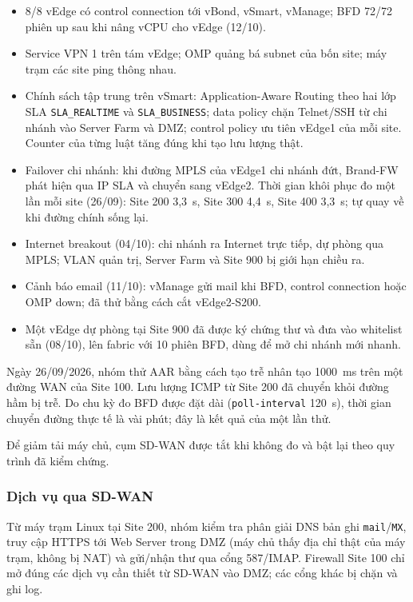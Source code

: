 \begin{itemize}
    \item 8/8 vEdge có control connection tới vBond, vSmart, vManage; BFD 72/72 phiên up sau khi nâng vCPU cho vEdge (12/10).
    \item Service VPN 1 trên tám vEdge; OMP quảng bá subnet của bốn site; máy trạm các site ping thông nhau.
    \item Chính sách tập trung trên vSmart: Application-Aware Routing theo hai lớp SLA \texttt{SLA\_REALTIME} và \texttt{SLA\_BUSINESS}; data policy chặn Telnet/SSH từ chi nhánh vào Server Farm và DMZ; control policy ưu tiên vEdge1 của mỗi site. Counter của từng luật tăng đúng khi tạo lưu lượng thật.
    \item Failover chi nhánh: khi đường MPLS của vEdge1 chi nhánh đứt, Brand-FW phát hiện qua IP SLA và chuyển sang vEdge2. Thời gian khôi phục đo một lần mỗi site (26/09): Site 200 3,3~s, Site 300 4,4~s, Site 400 3,3~s; tự quay về khi đường chính sống lại.
    \item Internet breakout (04/10): chi nhánh ra Internet trực tiếp, dự phòng qua MPLS; VLAN quản trị, Server Farm và Site 900 bị giới hạn chiều ra.
    \item Cảnh báo email (11/10): vManage gửi mail khi BFD, control connection hoặc OMP down; đã thử bằng cách cắt vEdge2-S200.
    \item Một vEdge dự phòng tại Site 900 đã được ký chứng thư và đưa vào whitelist sẵn (08/10), lên fabric với 10 phiên BFD, dùng để mở chi nhánh mới nhanh.
\end{itemize}

Ngày 26/09/2026, nhóm thử AAR bằng cách tạo trễ nhân tạo 1000~ms trên một đường WAN của Site 100. Lưu lượng ICMP từ Site 200 đã chuyển khỏi đường hầm bị trễ. Do chu kỳ đo BFD được đặt dài (\texttt{poll-interval} 120~s), thời gian chuyển đường thực tế là vài phút; đây là kết quả của một lần thử.

Để giảm tải máy chủ, cụm SD-WAN được tắt khi không đo và bật lại theo quy trình đã kiểm chứng.

\subsubsection{Dịch vụ qua SD-WAN}

Từ máy trạm Linux tại Site 200, nhóm kiểm tra phân giải DNS bản ghi \texttt{mail}/\texttt{MX}, truy cập HTTPS tới Web Server trong DMZ (máy chủ thấy địa chỉ thật của máy trạm, không bị NAT) và gửi/nhận thư qua cổng 587/IMAP. Firewall Site 100 chỉ mở đúng các dịch vụ cần thiết từ SD-WAN vào DMZ; các cổng khác bị chặn và ghi log.

